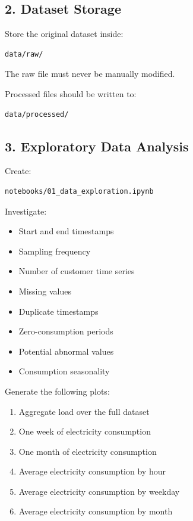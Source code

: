 \documentclass[11pt,a4paper]{article}
\begin{document}
\subsection{2. Dataset Storage}

Store the original dataset inside:

\begin{lstlisting}
data/raw/
\end{lstlisting}

The raw file must never be manually modified.

Processed files should be written to:

\begin{lstlisting}
data/processed/
\end{lstlisting}

\subsection{3. Exploratory Data Analysis}

Create:

\begin{lstlisting}
notebooks/01_data_exploration.ipynb
\end{lstlisting}

Investigate:

\begin{itemize}
    \item Start and end timestamps
    \item Sampling frequency
    \item Number of customer time series
    \item Missing values
    \item Duplicate timestamps
    \item Zero-consumption periods
    \item Potential abnormal values
    \item Consumption seasonality
\end{itemize}

Generate the following plots:

\begin{enumerate}
    \item Aggregate load over the full dataset
    \item One week of electricity consumption
    \item One month of electricity consumption
    \item Average electricity consumption by hour
    \item Average electricity consumption by weekday
    \item Average electricity consumption by month
\end{enumerate}
\end{document}
